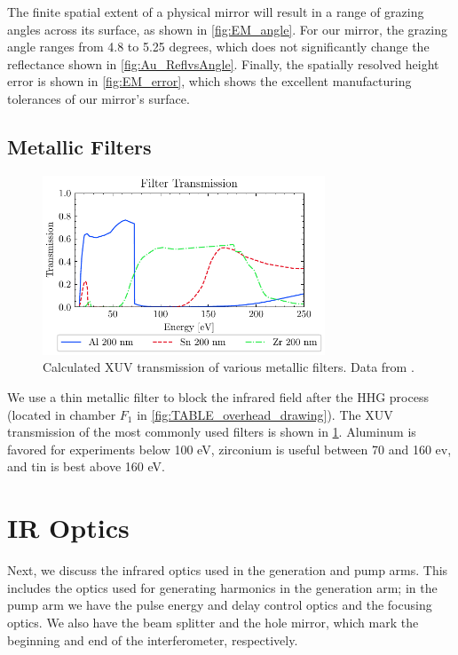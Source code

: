 The finite spatial extent of a physical mirror will result in a range of grazing angles across its surface, as shown in \cref{fig:EM_angle}. For our mirror, the grazing angle ranges from 4.8 to 5.25 degrees, which does not significantly change the reflectance shown in \cref{fig:Au_ReflvsAngle}. Finally, the spatially resolved height error is shown in \cref{fig:EM_error}, which shows the excellent manufacturing tolerances of our mirror's surface.

\subsection{Metallic Filters}

\begin{figure}
	\centering
	\includegraphics[width=0.75\textwidth]{figures/chap2/Filter_transmission_CXRO.pdf}
	\caption{Calculated XUV transmission of various metallic filters. Data from \cite{gulliksonCXROXRayInteractions}.}
	\label{fig:Filter_transmission_CXRO}
\end{figure}

We use a thin metallic filter to block the infrared field after the HHG process (located in chamber $F_1$ in \cref{fig:TABLE_overhead_drawing}). The XUV transmission of the most commonly used filters is shown in \cref{fig:Filter_transmission_CXRO}. Aluminum is favored for experiments below 100 eV, zirconium is useful between 70 and 160 ev, and tin is best above 160 eV. 

\section{IR Optics}
Next, we discuss the infrared optics used in the generation and pump arms. This includes the optics used for generating harmonics in the generation arm; in the pump arm we have the pulse energy and delay control optics and the focusing optics. We also have the beam splitter and the hole mirror, which mark the beginning and end of the interferometer, respectively.

